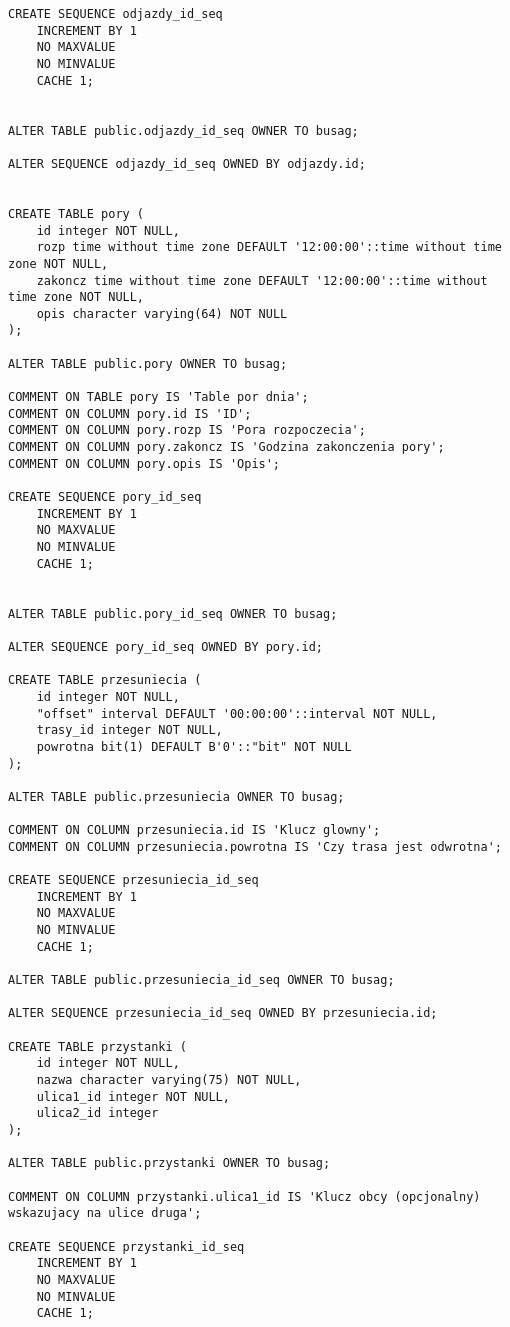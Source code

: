 \begin{lstlisting}
CREATE SEQUENCE odjazdy_id_seq
    INCREMENT BY 1
    NO MAXVALUE
    NO MINVALUE
    CACHE 1;


ALTER TABLE public.odjazdy_id_seq OWNER TO busag;

ALTER SEQUENCE odjazdy_id_seq OWNED BY odjazdy.id;


CREATE TABLE pory (
    id integer NOT NULL,
    rozp time without time zone DEFAULT '12:00:00'::time without time zone NOT NULL,
    zakoncz time without time zone DEFAULT '12:00:00'::time without time zone NOT NULL,
    opis character varying(64) NOT NULL
);

ALTER TABLE public.pory OWNER TO busag;

COMMENT ON TABLE pory IS 'Table por dnia';
COMMENT ON COLUMN pory.id IS 'ID';
COMMENT ON COLUMN pory.rozp IS 'Pora rozpoczecia';
COMMENT ON COLUMN pory.zakoncz IS 'Godzina zakonczenia pory';
COMMENT ON COLUMN pory.opis IS 'Opis';

CREATE SEQUENCE pory_id_seq
    INCREMENT BY 1
    NO MAXVALUE
    NO MINVALUE
    CACHE 1;


ALTER TABLE public.pory_id_seq OWNER TO busag;

ALTER SEQUENCE pory_id_seq OWNED BY pory.id;

CREATE TABLE przesuniecia (
    id integer NOT NULL,
    "offset" interval DEFAULT '00:00:00'::interval NOT NULL,
    trasy_id integer NOT NULL,
    powrotna bit(1) DEFAULT B'0'::"bit" NOT NULL
);

ALTER TABLE public.przesuniecia OWNER TO busag;

COMMENT ON COLUMN przesuniecia.id IS 'Klucz glowny';
COMMENT ON COLUMN przesuniecia.powrotna IS 'Czy trasa jest odwrotna';

CREATE SEQUENCE przesuniecia_id_seq
    INCREMENT BY 1
    NO MAXVALUE
    NO MINVALUE
    CACHE 1;

ALTER TABLE public.przesuniecia_id_seq OWNER TO busag;

ALTER SEQUENCE przesuniecia_id_seq OWNED BY przesuniecia.id;

CREATE TABLE przystanki (
    id integer NOT NULL,
    nazwa character varying(75) NOT NULL,
    ulica1_id integer NOT NULL,
    ulica2_id integer
);

ALTER TABLE public.przystanki OWNER TO busag;

COMMENT ON COLUMN przystanki.ulica1_id IS 'Klucz obcy (opcjonalny) wskazujacy na ulice druga';

CREATE SEQUENCE przystanki_id_seq
    INCREMENT BY 1
    NO MAXVALUE
    NO MINVALUE
    CACHE 1;


\end{lstlisting}
